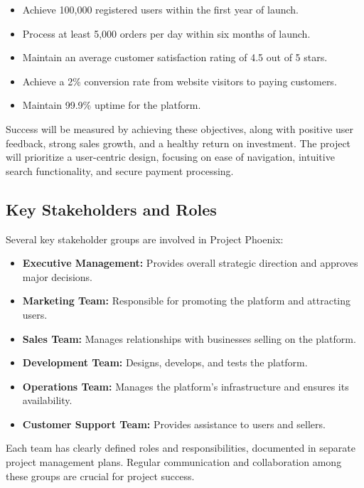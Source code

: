 \documentclass[11pt,a4paper,oneside]{article}
\begin{document}
\begin{itemize}
    \item Achieve 100,000 registered users within the first year of launch.
    \item Process at least 5,000 orders per day within six months of launch.
    \item Maintain an average customer satisfaction rating of 4.5 out of 5 stars.
    \item Achieve a 2\% conversion rate from website visitors to paying customers.
    \item Maintain 99.9\% uptime for the platform.
\end{itemize}

Success will be measured by achieving these objectives, along with positive user feedback, strong sales growth, and a healthy return on investment.  The project will prioritize a user-centric design, focusing on ease of navigation, intuitive search functionality, and secure payment processing.

\subsection{Key Stakeholders and Roles}

Several key stakeholder groups are involved in Project Phoenix:

\begin{itemize}
    \item \textbf{Executive Management:}  Provides overall strategic direction and approves major decisions.
    \item \textbf{Marketing Team:} Responsible for promoting the platform and attracting users.
    \item \textbf{Sales Team:}  Manages relationships with businesses selling on the platform.
    \item \textbf{Development Team:} Designs, develops, and tests the platform.
    \item \textbf{Operations Team:} Manages the platform's infrastructure and ensures its availability.
    \item \textbf{Customer Support Team:}  Provides assistance to users and sellers.
\end{itemize}

Each team has clearly defined roles and responsibilities, documented in separate project management plans.  Regular communication and collaboration among these groups are crucial for project success.
\end{document}
